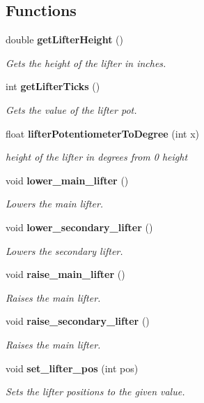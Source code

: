 \subsection*{Functions}
\begin{DoxyCompactItemize}
\item 
double \textbf{ get\+Lifter\+Height} ()
\begin{DoxyCompactList}\small\item\em Gets the height of the lifter in inches. \end{DoxyCompactList}\item 
int \textbf{ get\+Lifter\+Ticks} ()
\begin{DoxyCompactList}\small\item\em Gets the value of the lifter pot. \end{DoxyCompactList}\item 
float \textbf{ lifter\+Potentiometer\+To\+Degree} (int x)
\begin{DoxyCompactList}\small\item\em height of the lifter in degrees from 0 height \end{DoxyCompactList}\item 
void \textbf{ lower\+\_\+main\+\_\+lifter} ()
\begin{DoxyCompactList}\small\item\em Lowers the main lifter. \end{DoxyCompactList}\item 
void \textbf{ lower\+\_\+secondary\+\_\+lifter} ()
\begin{DoxyCompactList}\small\item\em Lowers the secondary lifter. \end{DoxyCompactList}\item 
void \textbf{ raise\+\_\+main\+\_\+lifter} ()
\begin{DoxyCompactList}\small\item\em Raises the main lifter. \end{DoxyCompactList}\item 
void \textbf{ raise\+\_\+secondary\+\_\+lifter} ()
\begin{DoxyCompactList}\small\item\em Raises the main lifter. \end{DoxyCompactList}\item 
void \textbf{ set\+\_\+lifter\+\_\+pos} (int pos)
\begin{DoxyCompactList}\small\item\em Sets the lifter positions to the given value. \end{DoxyCompactList}\item 

\end{DoxyCompactItemize}
